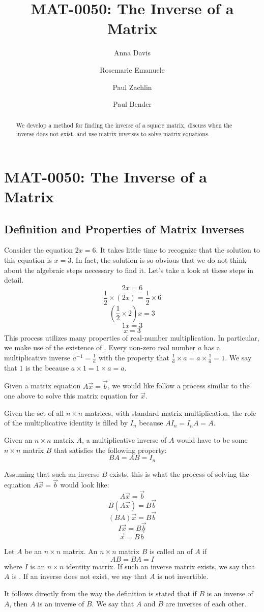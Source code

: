 \documentclass{ximera}
\author{Anna Davis \and Rosemarie Emanuele \and Paul Zachlin \and Paul Bender} \title{MAT-0050:  The Inverse of a Matrix} \license{CC-BY 4.0}
\begin{document}
\begin{abstract}
 We develop a method for finding the inverse of a square matrix, discuss when the inverse does not exist, and use matrix inverses to solve matrix equations.
\end{abstract}
\maketitle
\section*{MAT-0050:  The Inverse of a Matrix}
\subsection*{Definition and Properties of Matrix Inverses}
Consider the equation $2x=6$.  It takes little time to recognize that the solution to this equation is $x=3$.  In fact, the solution is so obvious that we do not think about the algebraic steps necessary to find it.  Let's take a look at these steps in detail.
$$2x=6$$
$$\frac{1}{2}\times (2x)=\frac{1}{2}\times 6$$
$$(\frac{1}{2}\times 2)x=3$$
$$1x=3$$
$$x=3$$
This process utilizes many properties of real-number multiplication.  In particular, we make use of the existence of .  Every non-zero real number $a$  has a multiplicative inverse $a^{-1}=\frac{1}{a}$ with the property that $\frac{1}{a}\times a=a\times \frac{1}{a}=1$.  We say that $1$ is the  because $a\times 1=1\times a=a$.

Given a matrix equation $A\vec{x}=\vec{b}$, we would like follow a process similar to the one above to solve this matrix equation for $\vec{x}$.  

Given the set of all $n\times n$ matrices, with standard matrix multiplication, the role of the multiplicative identity is filled by $I_n$ because $AI_n=I_nA=A$. 

Given an $n\times n$ matrix $A$, a multiplicative inverse of $A$ would have to be some $n\times n$ matrix $B$ that satisfies the following property:
$$BA=AB=I_n$$

Assuming that such an inverse $B$ exists, this is what the process of solving the equation $A\vec{x}=\vec{b}$ would look like:
$$A\vec{x}=\vec{b}$$
$$B(A\vec{x})=B\vec{b}$$
$$(BA)\vec{x}=B\vec{b}$$
$$I\vec{x}=B\vec{b}$$
$$\vec{x}=B\vec{b}$$

\begin{definition}\label{def:matinverse}
Let $A$ be an $n\times n$ matrix.  An $n\times n$ matrix $B$ is called an  of $A$ if 
$$AB=BA=I$$
where $I$ is an $n\times n$ identity matrix.  If such an inverse matrix exists, we say that $A$ is .  If an inverse does not exist, we say that $A$ is not invertible.
\end{definition}
It follows directly from the way the definition is stated that if $B$ is an inverse of $A$, then $A$ is an inverse of $B$. We say that $A$ and $B$ are inverses of each other.
\end{document}
